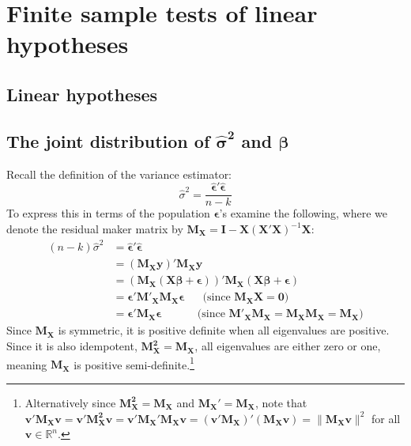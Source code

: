 \documentclass[DIV=14,titlepage=false]{scrreprt}
\begin{document}
\vspace{-10pt}
\setcounter{chapter}{4}

\chapter{Finite sample tests of linear hypotheses}
\vspace{-10pt}
\section{Linear hypotheses}
\section{The joint distribution of $\boldsymbol{\hat\sigma^2}$ and $\boldsymbol{\hat\beta}$}
Recall the definition of the variance estimator: \[\hat\sigma^2 = \frac{\boldsymbol{\hat\epsilon}'\boldsymbol{\hat\epsilon}}{n-k}\]
To express this in terms of the population $\boldsymbol{\epsilon}$'s examine the following, where we denote the residual maker matrix by $\mathbf{M_X}=\mathbf{I}-\mathbf{X}(\mathbf{X}'\mathbf{X})^{-1}\mathbf{X}$:
\begin{align*}
    (n-k)\hat\sigma^2&=\boldsymbol{\hat\epsilon}'\boldsymbol{\hat\epsilon}\\
    &= (\mathbf{M_X}\mathbf{y})'\mathbf{M_X}\mathbf{y} \\
    &= (\mathbf{M_X}(\mathbf{X}\boldsymbol{\beta}+\boldsymbol{\epsilon}))'\mathbf{M_X}(\mathbf{X}\boldsymbol{\beta}+\boldsymbol{\epsilon})\\
    &= \boldsymbol{\epsilon}'\mathbf{M'_X}\mathbf{M_X}\boldsymbol{\epsilon} \hspace{20pt} \text{(since $\mathbf{M_XX}=\mathbf{0}$)}\\
    &= \boldsymbol{\epsilon}'\mathbf{M_X}\boldsymbol{\epsilon} \hspace{39pt} \text{(since $\mathbf{M'_XM_X}=\mathbf{M_XM_X}=\mathbf{M_X}$)}
\end{align*}
 Since $\mathbf{M_X}$ is symmetric, it is positive definite when all eigenvalues are positive. Since it is also idempotent, $\mathbf{M^2_X}=\mathbf{M_X}$, all eigenvalues are either zero or one, meaning $\mathbf{M_X}$ is positive semi-definite.\footnote[1]{Alternatively since \( \mathbf{M_X^2} = \mathbf{M_X} \) and \( \mathbf{M_X}' = \mathbf{M_X} \), note that \( \mathbf{v}'\mathbf{M_Xv} = \mathbf{v}'\mathbf{M_X^2v} = \mathbf{v}'\mathbf{M_X}'\mathbf{M_Xv} = (\mathbf{v}'\mathbf{M_X})'(\mathbf{M_Xv}) = \|\mathbf{M_Xv}\|^2 \) for all \( \mathbf{v} \in \mathbb{R}^n \).
}
\end{document}
